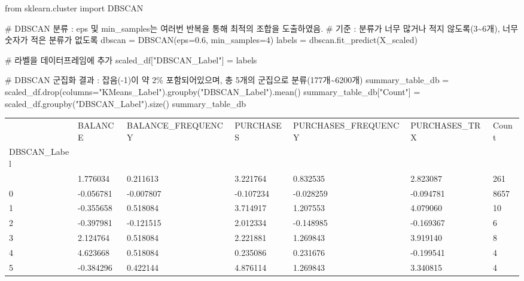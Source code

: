 \documentclass[
  a4paper,
  DIV=11,
  numbers=noendperiod]{scrreprt}
\newenvironment{Shaded}{\begin{snugshade}}{\end{snugshade}}
\newcommand{\CommentTok}[1]{\textcolor[rgb]{0.37,0.37,0.37}{#1}}
\newcommand{\DecValTok}[1]{\textcolor[rgb]{0.68,0.00,0.00}{#1}}
\newcommand{\FloatTok}[1]{\textcolor[rgb]{0.68,0.00,0.00}{#1}}
\newcommand{\ImportTok}[1]{\textcolor[rgb]{0.00,0.46,0.62}{#1}}
\newcommand{\NormalTok}[1]{\textcolor[rgb]{0.00,0.23,0.31}{#1}}
\newcommand{\OperatorTok}[1]{\textcolor[rgb]{0.37,0.37,0.37}{#1}}
\newcommand{\StringTok}[1]{\textcolor[rgb]{0.13,0.47,0.30}{#1}}
\begin{document}
\begin{Shaded}
\begin{Highlighting}[]
\ImportTok{from}\NormalTok{ sklearn.cluster }\ImportTok{import}\NormalTok{ DBSCAN}

\CommentTok{\# DBSCAN 분류 : eps 및 min\_samples는 여러번 반복을 통해 최적의 조합을 도출하였음.}
\CommentTok{\# 기준 : 분류가 너무 많거나 적지 않도록(3\textasciitilde{}6개), 너무 숫자가 적은 분류가 없도록}
\NormalTok{dbscan }\OperatorTok{=}\NormalTok{ DBSCAN(eps}\OperatorTok{=}\FloatTok{0.6}\NormalTok{, min\_samples}\OperatorTok{=}\DecValTok{4}\NormalTok{)}
\NormalTok{labels }\OperatorTok{=}\NormalTok{ dbscan.fit\_predict(X\_scaled)}

\CommentTok{\# 라벨을 데이터프레임에 추가}
\NormalTok{scaled\_df[}\StringTok{"DBSCAN\_Label"}\NormalTok{] }\OperatorTok{=}\NormalTok{ labels}

\CommentTok{\# DBSCAN 군집화 결과 : 잡음({-}1)이 약 2\% 포함되어있으며, 총 5개의 군집으로 분류(177개\textasciitilde{}6200개)}
\NormalTok{summary\_table\_db }\OperatorTok{=}\NormalTok{ scaled\_df.drop(columns}\OperatorTok{=}\StringTok{"KMeans\_Label"}\NormalTok{).groupby(}\StringTok{"DBSCAN\_Label"}\NormalTok{).mean()}
\NormalTok{summary\_table\_db[}\StringTok{"Count"}\NormalTok{] }\OperatorTok{=}\NormalTok{ scaled\_df.groupby(}\StringTok{"DBSCAN\_Label"}\NormalTok{).size()}
\NormalTok{summary\_table\_db}
\end{Highlighting}
\end{Shaded}

\begin{longtable}[]{@{}lllllll@{}}
\toprule\noalign{}
& BALANCE & BALANCE\_FREQUENCY & PURCHASES & PURCHASES\_FREQUENCY &
PURCHASES\_TRX & Count \\
DBSCAN\_Label & & & & & & \\
\midrule\noalign{}
\endhead
\bottomrule\noalign{}
\endlastfoot
-1 & 1.776034 & 0.211613 & 3.221764 & 0.832535 & 2.823087 & 261 \\
0 & -0.056781 & -0.007807 & -0.107234 & -0.028259 & -0.094781 & 8657 \\
1 & -0.355658 & 0.518084 & 3.714917 & 1.207553 & 4.079060 & 10 \\
2 & -0.397981 & -0.121515 & 2.012334 & -0.148985 & -0.169367 & 6 \\
3 & 2.124764 & 0.518084 & 2.221881 & 1.269843 & 3.919140 & 8 \\
4 & 4.623668 & 0.518084 & 0.235086 & 0.231676 & -0.199541 & 4 \\
5 & -0.384296 & 0.422144 & 4.876114 & 1.269843 & 3.340815 & 4 \\
\end{longtable}
\end{document}
